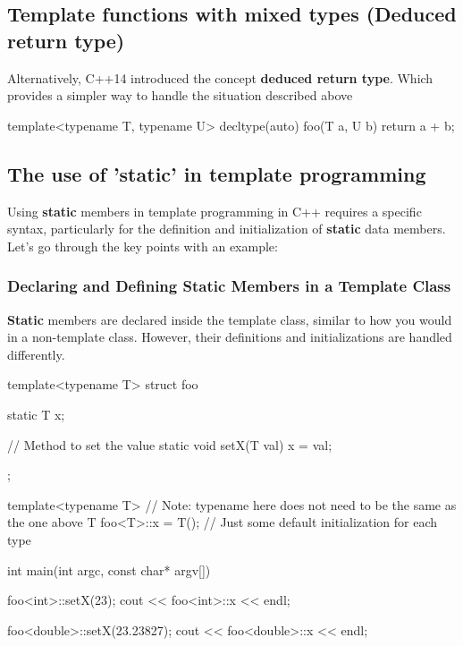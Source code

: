 \documentclass{report}
\begin{document}
\begin{concept}
    \pagebreak 
    \subsection{Template functions with mixed types (Deduced return type)}
    Alternatively, C++14 introduced the concept \textbf{deduced return type}. Which provides a simpler way to handle the situation described above
    \bigbreak \noindent 
    \begin{cppcode}
        template<typename T, typename U>
        decltype(auto) foo(T a, U b)  {
            return a + b;
        }
    \end{cppcode}

    \bigbreak \noindent 
    \subsection{The use of 'static' in template programming}
    \bigbreak \noindent 
    \begin{concept}
       Using \textbf{static} members in template programming in C++ requires a specific syntax, particularly for the definition and initialization of \textbf{static} data members. Let's go through the key points with an example:
    \end{concept}
    \bigbreak \noindent 
    \subsubsection{Declaring and Defining Static Members in a Template Class}
    \bigbreak \noindent 
    \textbf{Static} members are declared inside the template class, similar to how you would in a non-template class. However, their definitions and initializations are handled differently.
    \bigbreak \noindent 
    \begin{cppcode}
    template<typename T>
    struct foo {
        static T x; 

        // Method to set the value 
        static void setX(T val) {
            x = val;
        }
    };

    template<typename T> // Note: typename here does not need to be the same as the one above
    T foo<T>::x = T(); // Just some default initialization for each type

    int main(int argc, const char* argv[]) {

        foo<int>::setX(23);
        cout << foo<int>::x << endl;

        foo<double>::setX(23.23827);
        cout << foo<double>::x << endl;

}
\end{cppcode}
\end{concept}
\end{document}
